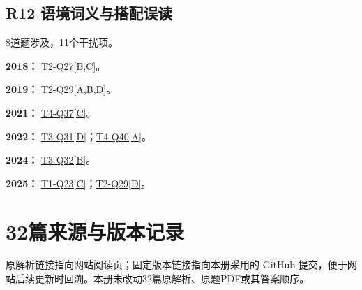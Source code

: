 \documentclass[11pt,a4paper]{article}
\begin{document}
\subsection{R12 语境词义与搭配误读}\label{class-R12}
8道题涉及，11个干扰项。

\noindent\textbf{2018：} \hyperref[idx-2018-T2-Q27]{T2-Q27[B,C]}。\par\smallskip
\noindent\textbf{2019：} \hyperref[idx-2019-T2-Q29]{T2-Q29[A,B,D]}。\par\smallskip
\noindent\textbf{2021：} \hyperref[idx-2021-T4-Q37]{T4-Q37[C]}。\par\smallskip
\noindent\textbf{2022：} \hyperref[idx-2022-T3-Q31]{T3-Q31[D]}；\hyperref[idx-2022-T4-Q40]{T4-Q40[A]}。\par\smallskip
\noindent\textbf{2024：} \hyperref[idx-2024-T3-Q32]{T3-Q32[B]}。\par\smallskip
\noindent\textbf{2025：} \hyperref[idx-2025-T1-Q23]{T1-Q23[C]}；\hyperref[idx-2025-T2-Q29]{T2-Q29[D]}。\par\smallskip
\clearpage\section{32篇来源与版本记录}\label{sources}
原解析链接指向网站阅读页；固定版本链接指向本册采用的 GitHub 提交，便于网站后续更新时回溯。本册未改动32篇原解析、原题PDF或其答案顺序。
\end{document}
